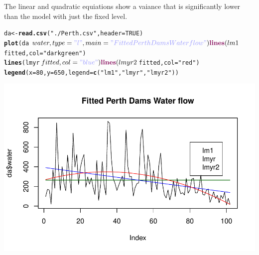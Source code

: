 \documentclass{article}\usepackage{graphicx, color}
\makeatletter
\def\maxwidth{ %
  \ifdim\Gin@nat@width>\linewidth
    \linewidth
  \else
    \Gin@nat@width
  \fi
}
\newcommand{\hlfunctioncall}[1]{\textcolor[rgb]{0.501960784313725,0,0.329411764705882}{\textbf{#1}}}%
\newcommand{\hlstring}[1]{\textcolor[rgb]{0.6,0.6,1}{#1}}%
\newenvironment{kframe}{%
 \def\at@end@of@kframe{}%
 \ifinner\ifhmode%
  \def\at@end@of@kframe{\end{minipage}}%
  \begin{minipage}{\columnwidth}%
 \fi\fi%
 \def\FrameCommand##1{\hskip\@totalleftmargin \hskip-\fboxsep
 \colorbox{shadecolor}{##1}\hskip-\fboxsep
     \hskip-\linewidth \hskip-\@totalleftmargin \hskip\columnwidth}%
 \MakeFramed {\advance\hsize-\width
   \@totalleftmargin\z@ \linewidth\hsize
   \@setminipage}}%
 {\par\unskip\endMakeFramed%
 \at@end@of@kframe}
\newenvironment{knitrout}{}{} %
\makeatother
\begin{document}
The linear and quadratic equiations show a vaiance that is significantly lower than the model with just the fixed level. 
\begin{knitrout}
\color{fgcolor}\begin{kframe}
\begin{alltt}
da <- \hlfunctioncall{read.csv}(\hlstring{"./Perth.csv"}, header = TRUE)
\hlfunctioncall{plot}(da$water, type = \hlstring{"l"}, main = \hlstring{"Fitted Perth Dams Water flow"})
\hlfunctioncall{lines}(lm1$fitted, col = \hlstring{"dark green"})
\hlfunctioncall{lines}(lmyr$fitted, col = \hlstring{"blue"})
\hlfunctioncall{lines}(lmyr2$fitted, col = \hlstring{"red"})
\hlfunctioncall{legend}(x = 80, y = 650, legend = \hlfunctioncall{c}(\hlstring{"lm1"}, \hlstring{"lmyr"}, \hlstring{"lmyr2"}))
\end{alltt}
\end{kframe}
\includegraphics[width=\maxwidth]{figure/perth2} 

\end{knitrout}
\end{document}
